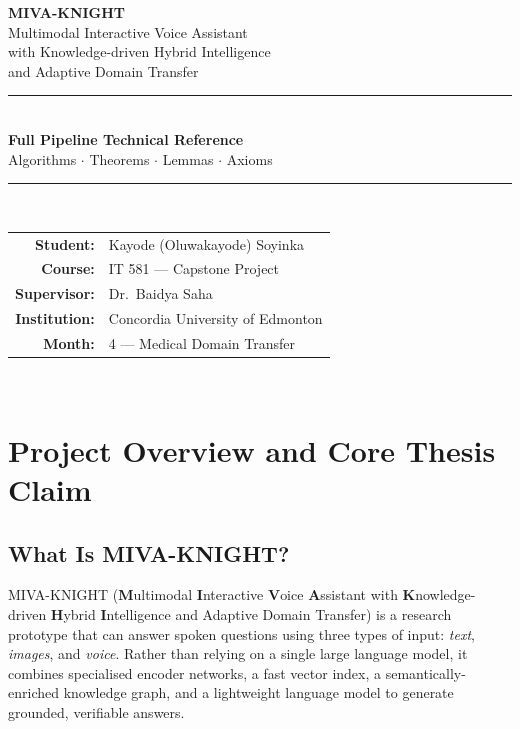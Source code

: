 \documentclass[12pt, a4paper]{article}
\theoremstyle{definition}
\theoremstyle{plain}
\theoremstyle{remark}
\begin{document}
\begin{titlepage}
  \centering
  \vspace*{2cm}
  {\Huge\bfseries MIVA-KNIGHT}\\[0.5em]
  {\Large Multimodal Interactive Voice Assistant\\
   with Knowledge-driven Hybrid Intelligence\\
   and Adaptive Domain Transfer}\\[2em]
  \rule{\linewidth}{1pt}\\[1em]
  {\large\bfseries Full Pipeline Technical Reference}\\
  {\large Algorithms $\cdot$ Theorems $\cdot$ Lemmas $\cdot$ Axioms}\\[2em]
  \rule{\linewidth}{0.5pt}\\[1em]
  \begin{tabular}{rl}
    \textbf{Student:}    & Kayode (Oluwakayode) Soyinka \\
    \textbf{Course:}     & IT 581 --- Capstone Project \\
    \textbf{Supervisor:} & Dr.\ Baidya Saha \\
    \textbf{Institution:}& Concordia University of Edmonton \\
    \textbf{Month:}      & 4 --- Medical Domain Transfer \\
  \end{tabular}\\[3em]
  \tableofcontents
\end{titlepage}

\newpage
\section{Project Overview and Core Thesis Claim}
\label{sec:overview}

\subsection{What Is MIVA-KNIGHT?}

MIVA-KNIGHT (\textbf{M}ultimodal \textbf{I}nteractive \textbf{V}oice \textbf{A}ssistant with \textbf{K}nowledge-driven \textbf{H}ybrid \textbf{I}ntelligence and Adaptive Domain Transfer) is a research prototype that can answer spoken questions using three types of input: \emph{text}, \emph{images}, and \emph{voice}. Rather than relying on a single large language model, it combines specialised encoder networks, a fast vector index, a semantically-enriched knowledge graph, and a lightweight language model to generate grounded, verifiable answers.
\end{document}
